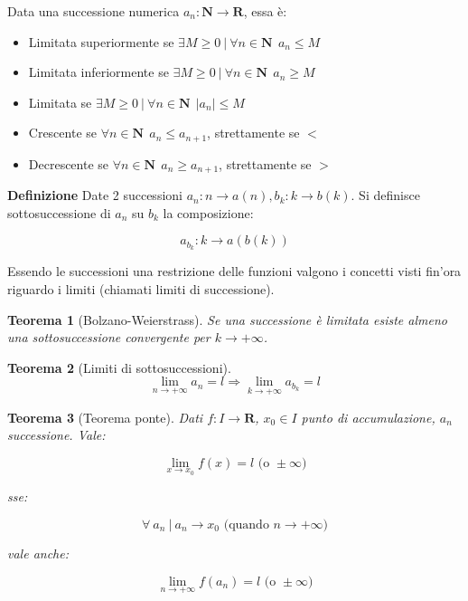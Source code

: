 \documentclass{article}
\newtheorem{theorem}{Teorema}
\begin{document}
\noindent Data una successione numerica $a_n:\mathbf{N}\rightarrow\mathbf{R}$, essa è:
\begin{itemize}
    \item Limitata superiormente se $\exists M\geq0\ |\ \forall n\in\mathbf{N}\ \ a_n\leq M$
    
    \item Limitata inferiormente se $\exists M\geq0\ |\ \forall n\in\mathbf{N}\ \ a_n\geq M$
    
    \item Limitata se $\exists M\geq0\ |\ \forall n\in\mathbf{N}\ \  |a_n|\leq M$

    \item Crescente se $\forall n\in\mathbf{N}\ \  a_n\leq a_{n+1}$, strettamente se $<$

    \item Decrescente se $\forall n\in\mathbf{N}\ \  a_n\geq a_{n+1}$, strettamente se $>$\newline

\end{itemize}

\noindent\textbf{Definizione} Date 2 successioni $a_n:n\rightarrow a(n),b_k:k\rightarrow b(k)$. Si definisce sottosuccessione di $a_n$ su $b_k$ la composizione:

$$a_{b_k}:k\rightarrow a(b(k))$$\newline

\noindent Essendo le successioni una restrizione delle funzioni valgono i concetti visti fin'ora riguardo i limiti (chiamati limiti di successione).\newline

\begin{theorem}[Bolzano-Weierstrass]
    Se una successione è limitata esiste almeno una sottosuccessione convergente per $k\rightarrow+\infty$.\newline
\end{theorem}

\begin{theorem}[Limiti di sottosuccessioni]
$$\lim_{n\rightarrow+\infty}a_n=l\Rightarrow\lim_{k\rightarrow+\infty}a_{b_k}=l$$\newline
\end{theorem}

\begin{theorem}[Teorema ponte]

Dati $f:I\rightarrow\mathbf{R}$, $x_0\in I$ punto di accumulazione, $a_n$ successione. Vale:

$$\lim_{x\rightarrow x_0}f(x)=l\text{ (o }\pm\infty)$$

sse:

$$\forall\ a_n\ |\ a_n\rightarrow x_0\text{ (quando }n\rightarrow+\infty)$$

vale anche:

$$
  \lim_{n\rightarrow+\infty}f(a_n)=l\text{ (o }\pm\infty)$$\newline
\end{theorem}
\end{document}
